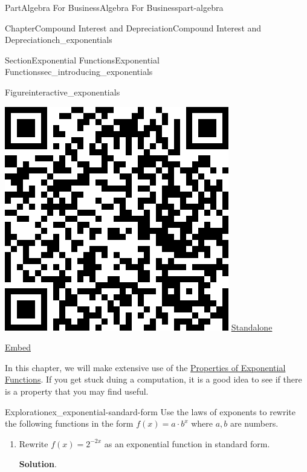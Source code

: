 \documentclass[oneside,10pt,]{tufte-book}
\newcommand{\blocktitlefont}{\relax}
\numberwithin{equation}{chapter}
\begin{document}
\begin{partptx}{Part}{Algebra For Business}{}{Algebra For Business}{}{}{part-algebra}
\begin{chapterptx}{Chapter}{Compound Interest and Depreciation}{}{Compound Interest and Depreciation}{}{}{ch_exponentials}
\begin{sectionptx}{Section}{Exponential Functions}{}{Exponential Functions}{}{}{sec_introducing_exponentials}
\begin{figureptx}{Figure}{}{interactive_exponentials}{}
\begin{sidebyside}{2}{0.075}{0.075}{0.17}
\begin{sbspanel}{0.21}
\includegraphics[width=\linewidth]{generated/qrcode/interactive_exponentials-1.png}
\href{http://webwork.bridgew.edu/oer/functions_at_work/interactive_exponentials-1.html}{Standalone}%
\par
\href{http://webwork.bridgew.edu/oer/functions_at_work/interactive_exponentials-1-if.html}{Embed}%
\end{sbspanel}%
\end{sidebyside}%
\tcblower
\end{figureptx}%
In this chapter, we will make extensive use of the \hyperref[exponential-arithmetic]{Properties of Exponential Functions}. If you get stuck duing a computation, it is a good idea to see if there is a property that you may find useful.%
\begin{exploration}{Exploration}{}{ex_exponential-sandard-form}%
Use the laws of exponents to rewrite the following functions in the form \(f(x) = a \cdot b^x\) where \(a,b\) are numbers.%
\begin{enumerate}[font=\bfseries,label=(\alph*),ref=\alph*]%
\item{}Rewrite \(f(x) = 2^{-2x}\) as an exponential function in standard form.%
\par\smallskip%
\noindent\textbf{\blocktitlefont Solution}.\hypertarget{ex_exponential-sandard-form-2-2}{}\quad{}%
\begin{align*}

\end{align*}
\end{enumerate}
\end{exploration}
\end{sectionptx}
\end{chapterptx}
\end{partptx}
\end{document}
